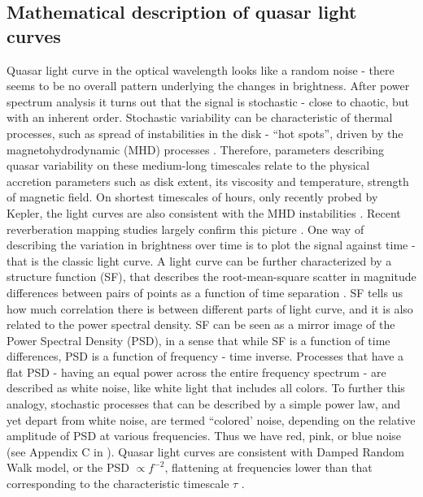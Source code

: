 \documentclass[modern]{aastex62}
\begin{document}
\subsection{Mathematical description of quasar light curves}
Quasar light curve in the optical wavelength looks like a random noise - there seems to be no overall pattern underlying the changes in brightness. After power spectrum analysis it turns out that the signal is stochastic - close to chaotic, but with an inherent order. Stochastic variability can be characteristic of thermal processes, such as spread of instabilities in the disk - ``hot spots'', driven by the magnetohydrodynamic (MHD) processes \citep{kelly2007, dexter2011, zu2013, kozlowski2016a}. Therefore, parameters describing quasar variability on these medium-long timescales relate to the physical accretion parameters such as disk extent, its viscosity and temperature, strength of magnetic field. On shortest timescales of hours, only recently probed by Kepler, the light curves are also consistent with  the MHD instabilities \citep{kasliwal2015a, aranzana2018, smith2018}. Recent reverberation mapping studies largely confirm this picture \citep{sun2015}. One way of describing the variation in brightness over time is to plot the signal against time - that is the classic light curve.  A light curve can be further characterized by a structure function (SF), that describes the root-mean-square scatter in magnitude differences between pairs of points as a function of time separation \citep{graham2014}. SF tells us how much correlation there is between different parts of light curve, and it is also related to the power spectral density. SF can be seen as a mirror image of the Power Spectral Density (PSD), in a sense that while SF is a function of time differences, PSD is a function of frequency - time inverse. Processes that have a flat PSD - having an equal power across the entire frequency spectrum -  are described as white noise, like white light that includes all colors. To further this analogy, stochastic processes that can be described by a simple power law, and yet depart from white noise, are termed  ``colored' noise, depending on the relative amplitude of PSD at various frequencies. Thus we have red, pink, or blue noise   (see Appendix  C in \cite{kasliwal2017}). Quasar light curves are consistent with Damped Random Walk model, or the PSD $\propto  f^{-2}$, flattening at frequencies lower than that corresponding to the characteristic timescale $\tau$ \citep{macleod2010,zu2013}.
\end{document}
